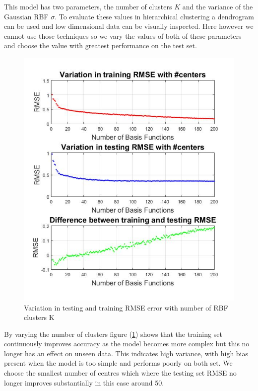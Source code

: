 \documentclass[a4paper,10pt, twocolumn]{article}
\begin{document}
This model has two parameters, the number of clusters $K$ and the variance of the Gaussian RBF $\sigma$. To evaluate these values in hierarchical clustering a dendrogram can be used and low dimensional data can be visually inspected. Here however we cannot use those techniques so we vary the values of both of these parameters and choose the value with greatest performance on the test set.

\begin{figure}[t]
	\includegraphics[width=0.7\linewidth]{VaryingK.jpg}
	\centering
	\caption{Variation in testing and training RMSE error with number of RBF clusters K}
		\label{fig:VaryingK}
\end{figure}

By varying the number of clusters figure (\ref{fig:VaryingK}) shows that the training set continuously improves accuracy as the model becomes more complex but this no longer has an effect on unseen data. This indicates high variance, with high bias present when the model is too simple and performs poorly on both set. We choose the smallest number of centres which where the testing set RMSE no longer improves substantially in this case around 50. 
\end{document}
